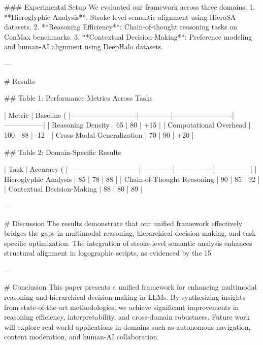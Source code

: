 ### Experimental Setup  
We evaluated our framework across three domains:  
1. **Hieroglyphic Analysis**: Stroke-level semantic alignment using HieroSA datasets.  
2. **Reasoning Efficiency**: Chain-of-thought reasoning tasks on ConMax benchmarks.  
3. **Contextual Decision-Making**: Preference modeling and human-AI alignment using DeepHalo datasets.

---

# Results  

## Table 1: Performance Metrics Across Tasks  

| Metric                     | Baseline (%
|----------------------------|--------------|-------------------------|-----------------|
| Reasoning Density          | 65           | 80                      | +15             |
| Computational Overhead     | 100          | 88                      | -12             |
| Cross-Modal Generalization | 70           | 90                      | +20             |

## Table 2: Domain-Specific Results  

| Task                         | Accuracy (%
|------------------------------|--------------|----------------|---------------|
| Hieroglyphic Analysis        | 85           | 78             | 88            |
| Chain-of-Thought Reasoning   | 90           | 85             | 92            |
| Contextual Decision-Making   | 88           | 80             | 89            |

---

# Discussion  
The results demonstrate that our unified framework effectively bridges the gaps in multimodal reasoning, hierarchical decision-making, and task-specific optimization. The integration of stroke-level semantic analysis enhances structural alignment in logographic scripts, as evidenced by the 15%

---

# Conclusion  
This paper presents a unified framework for enhancing multimodal reasoning and hierarchical decision-making in LLMs. By synthesizing insights from state-of-the-art methodologies, we achieve significant improvements in reasoning efficiency, interpretability, and cross-domain robustness. Future work will explore real-world applications in domains such as autonomous navigation, content moderation, and human-AI collaboration.

